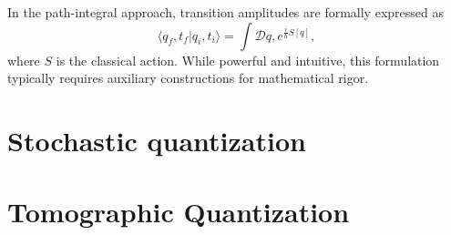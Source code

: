 In the path-integral approach, transition amplitudes are formally expressed as
\begin{equation}
\langle q_f,t_f | q_i,t_i \rangle = \int \mathcal{D}q, e^{\frac{i}{\hbar}S[q]},
\end{equation}
where $S$ is the classical action. While powerful and intuitive, this formulation typically requires auxiliary constructions for mathematical rigor.

\section{Stochastic quantization}
\label{stochastic-quantization}

\section{Tomographic Quantization}
\label{tomographic-quantization}

